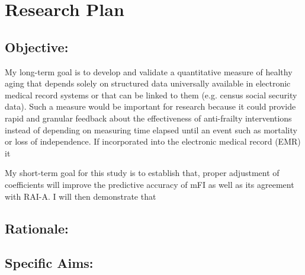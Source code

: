 \section{Research Plan }\label{research-plan}


\subsection{Objective:}\label{objective}
  
My long-term goal is to develop and validate a quantitative measure of healthy aging that depends solely on structured data universally available in electronic medical record systems or that can be linked to them (e.g. census social security data). Such a measure would be important for research because it could provide rapid and granular feedback about the effectiveness of anti-frailty interventions instead of depending on measuring time elapsed until an event such as mortality or loss of independence. If incorporated into the electronic medical record (EMR) it  

My short-term goal for this study is to establish that, proper adjustment of coefficients will improve the predictive accuracy of mFI as well as its agreement with RAI-A. I will then demonstrate that 

\subsection{Rationale:}\label{rationale}

\subsection{Specific Aims:}\label{specific-aims}
